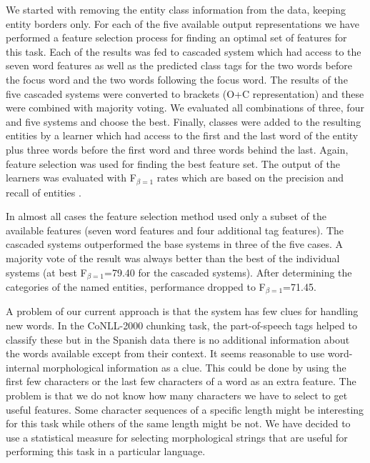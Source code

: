 \documentclass[10pt]{article}
\begin{document}
We started with removing the entity class information from the data,
keeping entity borders only.
For each of the five available output representations we have
performed a feature selection process for finding an optimal set
of features for this task.
Each of the results was fed to cascaded system which had access to the
seven word features as well as the predicted class tags for the two
words before the focus word and the two words following the focus
word.
The results of the five cascaded systems were converted to brackets
(O+C representation) and these were combined with majority voting.
We evaluated all combinations of three, four and five systems and
choose the best.
Finally, classes were added to the resulting entities by a learner
which had access to the first and the last word of the entity plus
three words before the first word and three words behind the last.
Again, feature selection was used for finding the best feature set.
The output of the learners was evaluated with F$_{\beta=1}$ rates
which are based on the precision and recall of entities
\cite{vanrijsbergen75}.

In almost all cases the feature selection method used only a subset of
the available features (seven word features and four additional tag
features).
The cascaded systems outperformed the base systems in three of the
five cases.
A majority vote of the result was always better than the best of the
individual systems (at best F$_{\beta=1}$=79.40 for the cascaded
systems).
After determining the categories of the named entities, performance
dropped to F$_{\beta=1}$=71.45.

A problem of our current approach is that the system has few clues
for handling new words.
In the CoNLL-2000 chunking task, the part-of-speech tags helped to
classify these but in the Spanish data there is no additional
information about the words available except from their context.
It seems reasonable to use word-internal morphological information as
a clue.
This could be done by using the first few characters or the last few
characters of a word as an extra feature.
The problem is that we do not know how many characters we have to
select to get useful features.
Some character sequences of a specific length might be interesting for
this task while others of the same length might be not.
We have decided to use a statistical measure for selecting
morphological strings that are useful for performing this task in a
particular language.
\end{document}

